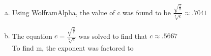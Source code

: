 \documentclass[12pt]{article}
\newenvironment{problem}[2][Problem]{\begin{trivlist}
\item[\hskip \labelsep {\bfseries #1}\hskip \labelsep {\bfseries #2.}]
  \vspace{1 cm}
}{\end{trivlist}}
\begin{document}
\begin{problem}{3.19} %
\item
\end{problem}

\begin{problem}{3.21} %
\item
  \begin{enumerate}[a.]
    \item %
      Using WolframAlpha\textsuperscript{\textregistered}, the value of c was found to be 
      $\frac{\sqrt{\frac{2}{\pi}}}{\sqrt[8]{e}} \approx .7041$
    \item %
      The equation $c = \frac{\sqrt{\frac{2}{\pi}}}{\sqrt[8]{e}}$ was solved to 
      find that $c \approx .5667$ \\ 
      To find m, the exponent was factored to
  \end{enumerate}
\end{problem}
\end{document}
